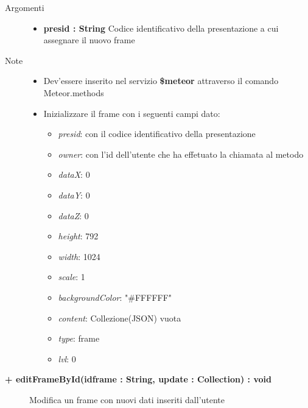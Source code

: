 \begin{description}
\begin{description}
		\begin{description}
			\item[Argomenti] \hfill
				\begin{itemize}
				
					\item \textbf{presid : String			} \hfill
					Codice identificativo della presentazione a cui assegnare il nuovo frame
					
				\end{itemize}
			\item[Note] \hfill
			\begin{itemize}
					\item Dev'essere inserito nel servizio \textbf{\$meteor} attraverso il comando Meteor.methods
					\item Inizializzare il frame con i seguenti campi dato:
					\begin{itemize}
					\item \textit{presid}: con il codice identificativo della presentazione
					\item \textit{owner}: con l'id dell'utente che ha effetuato la chiamata al metodo
					\item \textit{dataX}: 0
					\item \textit{dataY}: 0
					\item \textit{dataZ}: 0
					\item \textit{height}: 792
					\item \textit{width}: 1024
					\item \textit{scale}: 1
					\item \textit{backgroundColor}: "\#FFFFFF"
					\item \textit{content}: Collezione(JSON) vuota
					\item \textit{type}: frame
					\item \textit{lvl}: 0
					\end{itemize}
				\end{itemize}
		\end{description}
	\end{description}
	
	\begin{description}
		\item[\textbf{\color{blue}+ editFrameById(idframe : String, update : Collection) : void			}] \hfill
			Modifica un frame con nuovi dati inseriti dall'utente
			

\end{description}
\end{description}
